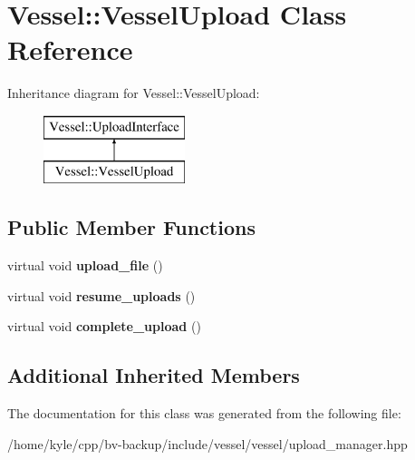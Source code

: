 \hypertarget{class_vessel_1_1_vessel_upload}{}\section{Vessel\+:\+:Vessel\+Upload Class Reference}
\label{class_vessel_1_1_vessel_upload}
Inheritance diagram for Vessel\+:\+:Vessel\+Upload\+:\begin{figure}[H]
\begin{center}
\leavevmode
\includegraphics[height=2.000000cm]{class_vessel_1_1_vessel_upload}
\end{center}
\end{figure}
\subsection*{Public Member Functions}
\begin{DoxyCompactItemize}
\item 
\mbox{\label{class_vessel_1_1_vessel_upload_af1f2f3fd9ca8d201139b599797fde9c5}} 
virtual void {\bfseries upload\+\_\+file} ()
\item 
\mbox{\label{class_vessel_1_1_vessel_upload_aa32f2e15f511307c9797287a1770e7a0}} 
virtual void {\bfseries resume\+\_\+uploads} ()
\item 
\mbox{\label{class_vessel_1_1_vessel_upload_a0a4b77ac363e86f66138db578ca9ca38}} 
virtual void {\bfseries complete\+\_\+upload} ()
\end{DoxyCompactItemize}
\subsection*{Additional Inherited Members}


The documentation for this class was generated from the following file\+:\begin{DoxyCompactItemize}
\item 
/home/kyle/cpp/bv-\/backup/include/vessel/vessel/upload\+\_\+manager.\+hpp\end{DoxyCompactItemize}

